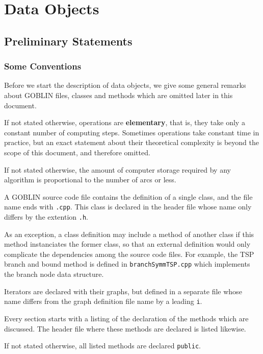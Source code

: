 \documentclass[a4paper,11pt,twoside]{book}
\begin{document}
\part{Data Objects}
\thispagestyle{empty}

\begin{multicols}{2}
\pagestyle{fancy}
\chapter{Preliminary Statements}
\thispagestyle{fancy}

\section{Some Conventions}

Before we start the description of data objects, we give some general remarks
about GOBLIN files, classes and methods which are omitted later in this document.
\begin{myitemize}
\item If not stated otherwise, operations are {\bf elementary},
    that is, they take only a constant number of computing steps. Sometimes operations take
    constant time in practice, but an exact statement about their theoretical
    complexity is beyond the scope of this document, and therefore omitted.
\item If not stated otherwise, the amount of computer storage required by any
    algorithm is proportional to the number of arcs or less.
\item A GOBLIN source code file contains the definition of a single class,
    and the file name ends with \verb/.cpp/. This class is declared in the
    header file whose name only differs by the extention \verb/.h/.

    As an exception, a class definition may include a method of another class if
    this method instanciates the former class, so that an external definition would
    only complicate the dependencies among the source code files. For example, the
    TSP branch and bound method is defined in \verb/branchSymmTSP.cpp/ which implements the
    branch node data structure.
\item Iterators are declared with their graphs, but defined in a separate file
    whose name differs from the graph definition file name by a leading
    \verb/i/.
\item Every section starts with a listing of the declaration of the methods
    which are discussed. The header file where these methods are declared
    is listed likewise.
\item If not stated otherwise, all listed methods are declared \verb/public/.
\end{myitemize}



\end{multicols}
\end{document}
